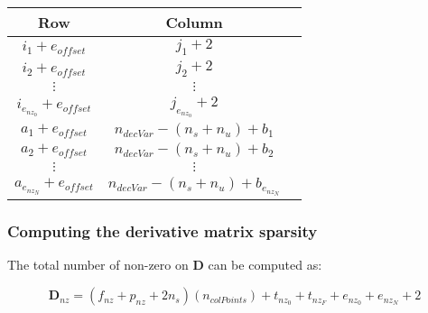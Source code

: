 \documentclass[12pt]{article}
\begin{document}
\begin{table}[!h]
\begin{center}
\begin{tabular}{c|c|c}
Row             & Column            \\ \hline
$i_1+e_{offset}$           & $j_1+2$         \\
$i_2+e_{offset}$           & $j_2+2$         \\
$\vdots$        & $\vdots$          \\
$i_{e_{nz_0}}+e_{offset}$  & $j_{e_{nz_0}}+2$  \\
$a_1+e_{offset}$           & $n_{decVar}-(n_s+n_u)+b_1$         \\
$a_2+e_{offset}$           & $n_{decVar}-(n_s+n_u)+b_2$         \\
$\vdots$        & $\vdots$          \\
$a_{e_{nz_N}}+e_{offset}$  & $n_{decVar}-(n_s+n_u)+b_{e_{nz_N}}$  \\
\end{tabular}
\end{center}
\end{table}

\subsubsection{Computing the derivative matrix sparsity}

The total number of non-zero on $\bm{D}$ can be computed as:

\begin{equation*}
    \bm{D}_{nz}=(f_{nz}+p_{nz}+2n_s)(n_{colPoints})+ t_{nz_0} + t_{nz_F} + e_{nz_0}+ e_{nz_N}+2
\end{equation*}

\newpage
\end{document}
